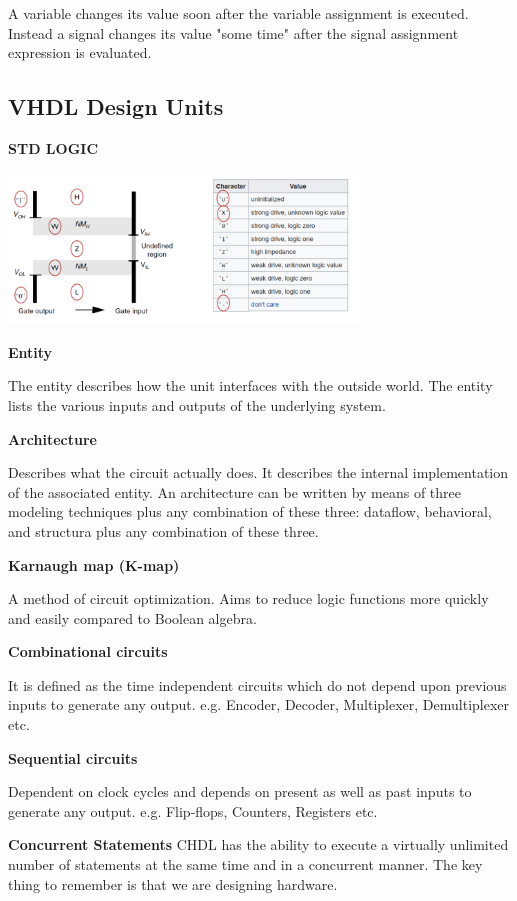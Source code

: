 A variable changes its value soon after the variable assignment is executed. Instead a signal
changes its value "some time" after the signal assignment expression is evaluated.


\subsection{VHDL Design Units}


\textbf{STD LOGIC}

\begin{center}
	\includegraphics[width = 0.7\textwidth]{images/stdlogic.png}
\end{center}



\textbf{Entity}

The entity describes how the unit interfaces with the outside world.
The entity lists the various inputs and outputs of the underlying system.


\textbf{Architecture}

Describes what the circuit actually does. It describes the internal
implementation of the associated entity. An architecture can be written by means of three modeling
techniques plus any combination of these three: dataflow, behavioral, and structura plus any combination of these three.


\textbf{Karnaugh map (K-map)}

A method of circuit optimization. Aims to reduce logic functions
more quickly and easily compared to Boolean algebra.

\textbf{Combinational circuits}

It is defined as the time independent circuits which do not depend upon previous
inputs to generate any output.
e.g. Encoder, Decoder, Multiplexer, Demultiplexer etc.

\textbf{Sequential circuits}

Dependent on clock cycles and depends on present as well as past inputs to generate any output.
e.g. Flip-flops, Counters, Registers etc.


\textbf{Concurrent Statements}
CHDL has the ability to execute a virtually unlimited number of statements at the same time and in a concurrent manner. The key thing to remember is that we are
designing hardware.

